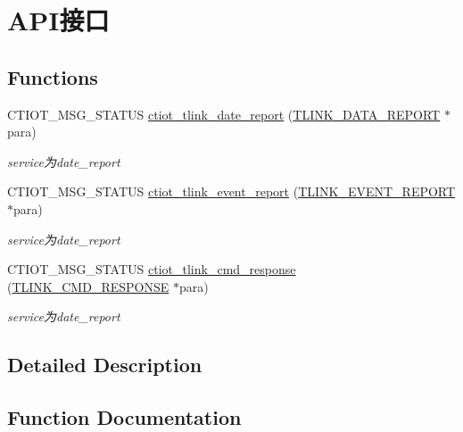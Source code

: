 \hypertarget{group___a_p_i_xE6_x8E_xA5_xE5_x8F_xA3}{}\section{A\+P\+I接口}
\label{group___a_p_i_xE6_x8E_xA5_xE5_x8F_xA3}
\subsection*{Functions}
\begin{DoxyCompactItemize}
\item 
C\+T\+I\+O\+T\+\_\+\+M\+S\+G\+\_\+\+S\+T\+A\+T\+US \mbox{\hyperlink{group___a_p_i_xE6_x8E_xA5_xE5_x8F_xA3_gaff29deec3201f1522d4a7b9f1bcf6ccc}{ctiot\+\_\+tlink\+\_\+date\+\_\+report}} (\mbox{\hyperlink{structtlink__data__report}{T\+L\+I\+N\+K\+\_\+\+D\+A\+T\+A\+\_\+\+R\+E\+P\+O\+RT}} $\ast$para)
\begin{DoxyCompactList}\small\item\em service为date\+\_\+report \end{DoxyCompactList}\item 
C\+T\+I\+O\+T\+\_\+\+M\+S\+G\+\_\+\+S\+T\+A\+T\+US \mbox{\hyperlink{group___a_p_i_xE6_x8E_xA5_xE5_x8F_xA3_ga6e89a05e9c93fedb069f72d9821d9411}{ctiot\+\_\+tlink\+\_\+event\+\_\+report}} (\mbox{\hyperlink{structtlink__event__report}{T\+L\+I\+N\+K\+\_\+\+E\+V\+E\+N\+T\+\_\+\+R\+E\+P\+O\+RT}} $\ast$para)
\begin{DoxyCompactList}\small\item\em service为date\+\_\+report \end{DoxyCompactList}\item 
C\+T\+I\+O\+T\+\_\+\+M\+S\+G\+\_\+\+S\+T\+A\+T\+US \mbox{\hyperlink{group___a_p_i_xE6_x8E_xA5_xE5_x8F_xA3_gacfa942fd4d7e83db79931e9ab50d91bd}{ctiot\+\_\+tlink\+\_\+cmd\+\_\+response}} (\mbox{\hyperlink{structtlink__cmd__response}{T\+L\+I\+N\+K\+\_\+\+C\+M\+D\+\_\+\+R\+E\+S\+P\+O\+N\+SE}} $\ast$para)
\begin{DoxyCompactList}\small\item\em service为date\+\_\+report \end{DoxyCompactList}\end{DoxyCompactItemize}


\subsection{Detailed Description}


\subsection{Function Documentation}
\mbox{\label{group___a_p_i_xE6_x8E_xA5_xE5_x8F_xA3_gacfa942fd4d7e83db79931e9ab50d91bd}} 
